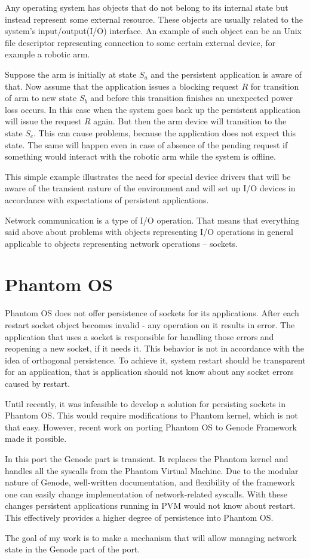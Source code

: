 Any operating system has objects that do not belong to its internal state but
instead represent some external resource. These objects are usually related to
the system's input/output(I/O) interface. An example of such object can be an
Unix file descriptor representing connection to some certain external device,
for example a robotic arm. 

Suppose the arm is initially at state $S_a$ and the persistent application is
aware of that. Now assume that the application issues a blocking request $R$
for transition of arm to new state $S_b$ and before this transition finishes an
unexpected power loss occurs. In this case when the system goes back up the
persistent application will issue the request $R$ again. But then the arm
device will transition to the state $S_c$. This can cause problems, because the
application does not expect this state. The same will happen even in case of
absence of the pending request if something would interact with the robotic arm
while the system is offline. 

This simple example illustrates the need for special device drivers that will
be aware of the transient nature of the environment and will set up I/O devices
in accordance with expectations of persistent applications.

Network communication is a type of I/O operation. That means that everything
said above about problems with objects representing I/O operations in general
applicable to objects representing network operations -- sockets.

\section{Phantom OS}

Phantom OS does not offer persistence of sockets for its applications. After
each restart socket object becomes invalid - any operation on it results in
error. The application that uses a socket is responsible for handling those
errors and reopening a new socket, if it needs it. This behavior is not in
accordance with the idea of orthogonal persistence. To achieve it, system
restart should be transparent for an application, that is application should
not know about any socket errors caused by restart.

Until recently, it was infeasible to develop a solution for persisting sockets
in Phantom OS. This would require modifications to Phantom kernel, which is not
that easy. However, recent work on porting Phantom OS to Genode Framework made
it possible. 

In this port the Genode part is transient. It replaces the Phantom kernel and
handles all the syscalls from the Phantom Virtual Machine. Due to the modular
nature of Genode, well-written documentation, and flexibility of the framework
one can easily change implementation of network-related syscalls. With these
changes persistent applications running in PVM would not know about restart.
This effectively provides a higher degree of persistence into Phantom OS.

The goal of my work is to make a mechanism that will allow managing network
state in the Genode part of the port.
